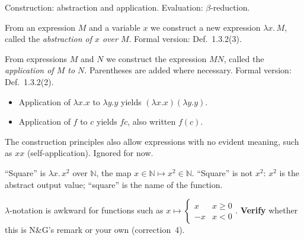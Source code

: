 \documentclass[11pt]{article}
\begin{document}
\begin{remark}
Construction: abstraction and application. Evaluation: $\beta$-reduction.
\end{remark}

\begin{definition}\label{def:abstraction-informal}
From an expression $M$ and a variable $x$ we construct a new expression
$\lambda x.\, M$, called the \emph{abstraction of $x$ over $M$}.
Formal version: Def.~1.3.2(3).
\end{definition}

\begin{definition}\label{def:application-informal}
From expressions $M$ and $N$ we construct the expression $MN$, called the
\emph{application of $M$ to $N$}. Parentheses are added where necessary.
Formal version: Def.~1.3.2(2).
\end{definition}

\begin{example}
\begin{itemize}
  \item Application of $\lambda x.x$ to $\lambda y.y$ yields
        $(\lambda x.x)(\lambda y.y)$.
  \item Application of $f$ to $c$ yields $fc$, also written $f(c)$.
\end{itemize}
\end{example}

\begin{remark}
The construction principles also allow expressions with no evident meaning,
such as $xx$ (self-application). Ignored for now.
\end{remark}

\begin{remark}
``Square'' is $\lambda x.\, x^2$ over $\mathbb{N}$, the map
$x \in \mathbb{N} \mapsto x^2 \in \mathbb{N}$. ``Square'' is not $x^2$:
$x^2$ is the abstract output value; ``square'' is the name of the function.
\end{remark}

\begin{remark}
$\lambda$-notation is awkward for functions such as
$x \mapsto \begin{cases} x & x \ge 0\\ -x & x<0 \end{cases}$.
\textbf{Verify} whether this is N\&G's remark or your own (correction~4).
\end{remark}
\end{document}
